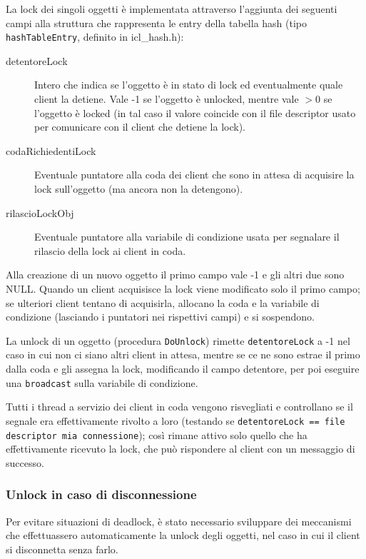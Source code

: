 \documentclass[a4paper,12pt]{article}
\begin{document}
La lock dei singoli oggetti è implementata attraverso l'aggiunta dei seguenti campi alla struttura che rappresenta le entry della tabella hash (tipo \texttt{hashTableEntry}, definito in icl\_hash.h):

\begin{description}
 \item[detentoreLock] Intero che indica se l'oggetto è in stato di lock ed eventualmente quale client la detiene. Vale -1 se l'oggetto è unlocked, mentre vale $> 0$ se l'oggetto è locked (in tal caso il valore coincide con il file descriptor usato per comunicare con il client che detiene la lock).
 \item[codaRichiedentiLock] Eventuale puntatore alla coda dei client che sono in attesa di acquisire la lock sull'oggetto (ma ancora non la detengono).
 \item[rilascioLockObj] Eventuale puntatore alla variabile di condizione usata per segnalare il rilascio della lock ai client in coda.
\end{description}

Alla creazione di un nuovo oggetto il primo campo vale -1 e gli altri due sono NULL. Quando un client acquisisce la lock viene modificato solo il primo campo; se ulteriori client tentano di acquisirla, allocano la coda e la variabile di condizione (lasciando i puntatori nei rispettivi campi) e si sospendono.

La unlock di un oggetto (procedura \texttt{DoUnlock}) rimette \texttt{detentoreLock} a -1 nel caso in cui non ci siano altri client in attesa, mentre se ce ne sono estrae il primo dalla coda e gli assegna la lock, modificando il campo detentore, per poi eseguire una \texttt{broadcast} sulla variabile di condizione.

Tutti i thread a servizio dei client in coda vengono risvegliati e controllano se il segnale era effettivamente rivolto a loro (testando se \texttt{detentoreLock == file descriptor mia connessione}); così rimane attivo solo quello che ha effettivamente ricevuto la lock, che può rispondere al client con un messaggio di successo.

\subsubsection*{ Unlock in caso di disconnessione }
Per evitare situazioni di deadlock, è stato necessario sviluppare dei meccanismi che effettuassero automaticamente la unlock degli oggetti, nel caso in cui il client si disconnetta senza farlo.
\end{document}

